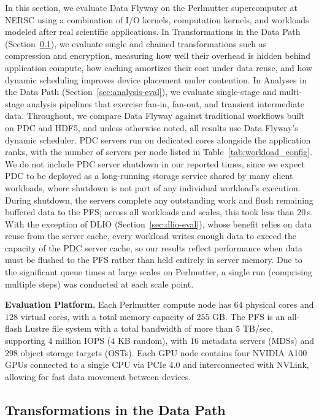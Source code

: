 In this section, we evaluate Data Flyway on the Perlmutter supercomputer at NERSC using a combination of I/O kernels, computation kernels, and workloads modeled after real scientific applications. In Transformations in the Data Path (Section~\ref{sec:transformations-eval}), we evaluate single and chained transformations such as compression and encryption, measuring how well their overhead is hidden behind application compute, how caching amortizes their cost under data reuse, and how dynamic scheduling improves device placement under contention. In Analyses in the Data Path (Section~\ref{sec:analysis-eval}), we evaluate single-stage and multi-stage analysis pipelines that exercise fan-in, fan-out, and transient intermediate data. Throughout, we compare Data Flyway against traditional workflows built on PDC and HDF5, and unless otherwise noted, all results use Data Flyway's dynamic scheduler. PDC servers run on dedicated cores alongside the application ranks, with the number of servers per node listed in Table~\ref{tab:workload_config}. We do not include PDC server shutdown in our reported times, since we expect PDC to be deployed as a long-running storage service shared by many client workloads, where shutdown is not part of any individual workload's execution. During shutdown, the servers complete any outstanding work and flush remaining buffered data to the PFS; across all workloads and scales, this took less than 20\,s. With the exception of DLIO (Section~\ref{sec:dlio-eval}), whose benefit relies on data reuse from the server cache, every workload writes enough data to exceed the capacity of the PDC server cache, so our results reflect performance when data must be flushed to the PFS rather than held entirely in server memory. Due to the significant queue times at large scales on Perlmutter, a single run (comprising multiple steps) was conducted at each scale point.

\textbf{Evaluation Platform.} Each Perlmutter compute node has $64$ physical cores and $128$ virtual cores, with a total memory capacity of $255$ GB. The PFS is an all-flash Lustre file system with a total bandwidth of more than $5$ TB/sec, supporting $4$ million IOPS ($4$ KB random), with $16$ metadata servers (MDSs) and $298$ object storage targets (OSTs). Each GPU node contains four NVIDIA A100 GPUs connected to a single CPU via PCIe 4.0 and interconnected with NVLink, allowing for fast data movement between devices. 

\subsection{Transformations in the Data Path}
\label{sec:transformations-eval}

